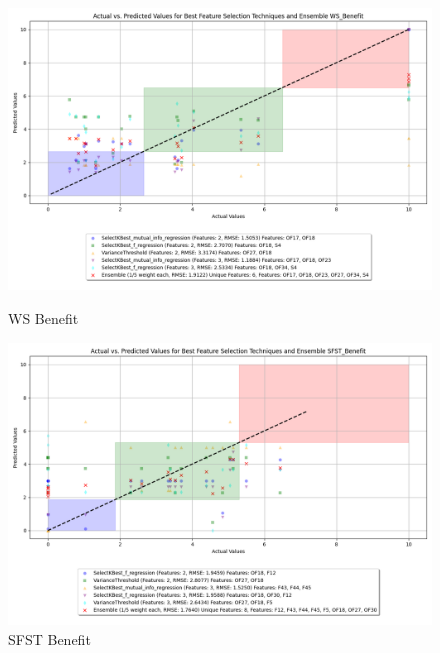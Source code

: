 \begin{figure}[H]
    \centering
    \begin{minipage}{0.45\textwidth}
        \centering
        \includegraphics[width=\linewidth]{reg_section_all/images_reg_featred_ensemble/actual_vs_predicted_smallest_feature_selection_and_ensemble_WS_Benefit.png}
        \caption{WS Benefit}
        \label{fig:ws_ben_reg_featred_smallest_ensemble}
    \end{minipage}\hfill
    \begin{minipage}{0.45\textwidth}
        \centering
        \includegraphics[width=\linewidth]{reg_section_all/images_reg_featred_ensemble/actual_vs_predicted_smallest_feature_selection_and_ensemble_SFST_Benefit.png}
        \caption{SFST Benefit}
        \label{fig:sfst_ben_reg_featred_smallest_ensemble}
    \end{minipage}
\end{figure}